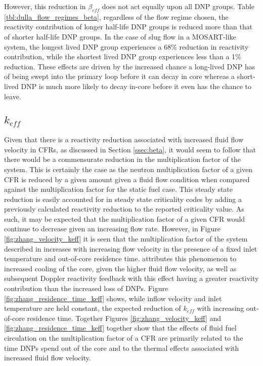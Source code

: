 \documentclass[review]{elsarticle}
\begin{document}
However,
this reduction in $\beta_{eff}$ does not act equally upon all DNP groups. Table
\ref{tbl:dulla_flow_regimes_beta}, regardless of the flow regime chosen,
the reactivity contribution of longer half-life DNP groups is
reduced more than that of shorter half-life DNP groups. In the case of slug
flow in a MOSART-like system, the longest lived DNP group experiences a 68\%
reduction in reactivity contribution, while the shortest lived DNP group
experiences less than a 1\% reduction. These effects are driven by the increased
chance a long-lived DNP has of being swept into the primary loop before it can
decay in core whereas a short-lived DNP is much more likely to decay in-core
before it even has the chance to leave.

\subsection{$k_{eff}$} \label{ssec:keff}
Given that there is a reactivity reduction associated with increased fluid flow
velocity in CFRs, as discussed in Section \ref{ssec:beta}, it would seem to follow
that there would be a commensurate reduction in the multiplication factor of
the system. This is certainly the case as the neutron multiplication factor
of a given CFR is reduced by a given amount given a fluid flow condition
when compared against the multiplication factor for the static fuel case.
This steady state reduction is easily accounted for in steady state
criticality codes by adding a previously calculated reactivity
reduction to the reported criticality value. As such, it may be expected
that the multiplication factor of a given CFR would continue to decrease
given an increasing flow rate. 
However, in Figure \ref{fig:zhang_velocity_keff} it is seen that the
multiplication factor of the system described in \cite{zhang_development_2009-1}
increases with increasing flow velocity in the presence of a fixed inlet
temperature and out-of-core
residence time. \cite{zhang_development_2009-1} attributes
this phenomenon to increased cooling of the core, given the higher fluid flow 
velocity, as well as subsequent Doppler reactivity feedback with this effect
having a greater reactivity contribution than the increased loss of DNPs.
Figure \ref{fig:zhang_residence_time_keff} shows, while inflow
velocity and inlet temperature are held constant, 
the expected reduction of
$k_{eff}$ with increasing out-of-core residence time. Together
Figures \ref{fig:zhang_velocity_keff} and
\ref{fig:zhang_residence_time_keff} together show that the
effects of fluid fuel circulation on the multiplication factor
of a CFR are primarily related to the time DNPs spend out of
the core and to the thermal effects associated with increased
fluid flow velocity. 
\end{document}
